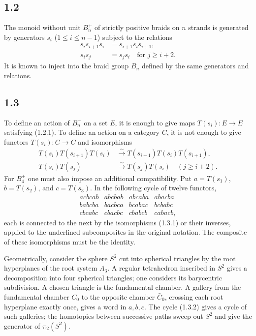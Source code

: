 \documentclass[11pt]{article}
\begin{document}
\subsection*{1.2}
The monoid without unit $B_n^+$ of strictly positive braids on $n$ strands is generated by generators $s_i$ ($1\le i\le n-1$) subject to the relations
\begin{align}
s_i s_{i+1}s_i &= s_{i+1}s_i s_{i+1}, \tag{1.2.1}\\
s_i s_j &= s_j s_i \quad\text{for } j\ge i+2.
\end{align}
It is known to inject into the braid group $B_n$ defined by the same generators and relations.

\subsection*{1.3}
To define an action of $B_n^+$ on a set $E$, it is enough to give maps $T(s_i):E\to E$ satisfying (1.2.1). To define an action on a category $C$, it is not enough to give functors $T(s_i):C\to C$ and isomorphisms
\begin{align}
T(s_i)T(s_{i+1})T(s_i)&\xrightarrow{\sim}T(s_{i+1})T(s_i)T(s_{i+1}),\tag{1.3.1}\\
T(s_i)T(s_j)&\xrightarrow{\sim}T(s_j)T(s_i) \quad (j\ge i+2).
\end{align}
For $B_4^+$ one must also impose an additional compatibility. Put $a=T(s_1)$, $b=T(s_2)$, and $c=T(s_3)$. In the following cycle of twelve functors,
\[
\begin{array}{llll}
acbcab & abcbab & abcaba & abacba\\
babcba & bacbca & bcabac & bcbabc\\
cbcabc & cbacbc & cbabcb & cabacb,
\end{array}\tag{1.3.2}
\]
each is connected to the next by the isomorphisms (1.3.1) or their inverses, applied to the underlined subcomposites in the original notation. The composite of these isomorphisms must be the identity.

Geometrically, consider the sphere $S^2$ cut into spherical triangles by the root hyperplanes of the root system $A_3$. A regular tetrahedron inscribed in $S^2$ gives a decomposition into four spherical triangles; one considers its barycentric subdivision. A chosen triangle is the fundamental chamber. A gallery from the fundamental chamber $C_0$ to the opposite chamber $\bar C_0$, crossing each root hyperplane exactly once, gives a word in $a,b,c$. The cycle (1.3.2) gives a cycle of such galleries; the homotopies between successive paths sweep out $S^2$ and give the generator of $\pi_2(S^2)$.
\end{document}
